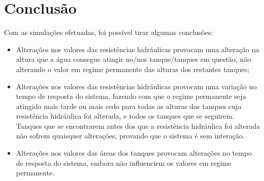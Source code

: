 \documentclass[11pt]{article}
\begin{document}
\section{Conclusão}
Com as simulações efetuadas, foi possível tirar algumas conclusões:
\begin{itemize}
\item Alterações nos valores das resistências hidráulicas provocam uma alteração na altura que a água consegue atingir no/nos tanque/tanques em questão, não alterando o valor em regime permanente das alturas dos restantes tanques;
\item Alterações nos valores das resistências hidráulicas provocam uma variação no tempo de resposta do sistema, fazendo com que o regime permanente seja atingido mais tarde ou mais cedo para todas as alturas dos tanques cuja resistência hidráulica foi alterada, e todos os tanques que se seguirem. Tanques que se encontrarem antes dos que a resistência hidráulica foi alterada não sofrem quaisquer alterações, provando que o sistema é sem interação.
\item Alterações nos valores das áreas dos tanques provocam alterações no tempo de resposta do sistema, embora não influenciem os valores em regime permanente.
\end{itemize}
\end{document}
